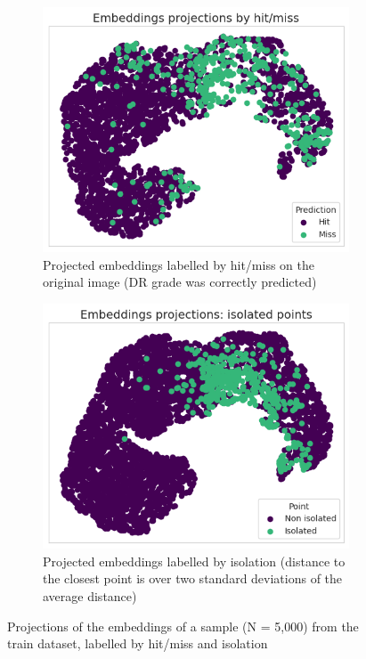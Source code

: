\begin{figure}[tb]
     \centering
     \begin{subfigure}[b]{0.49\textwidth}
        \centering
        \includegraphics[width=\textwidth]{figures/chapter6/embeddings/hit_miss.png}
        \caption{Projected embeddings labelled by hit/miss on the original image (DR grade was correctly predicted)}
        \label{fig:hit_miss}
     \end{subfigure}
     \hfill
     \begin{subfigure}[b]{0.49\textwidth}
        \includegraphics[width=\textwidth]{figures/chapter6/embeddings/isolated.png}
        \caption{Projected embeddings labelled by isolation (distance to the closest point is over two standard deviations of the average distance)}
        \label{fig:isolated}
     \end{subfigure}
     \hfill
    \caption{Projections of the embeddings of a sample (N = 5,000) from the train dataset, labelled by hit/miss and isolation}
    \label{fig:embeddings_explore}
    \centering
\end{figure}


